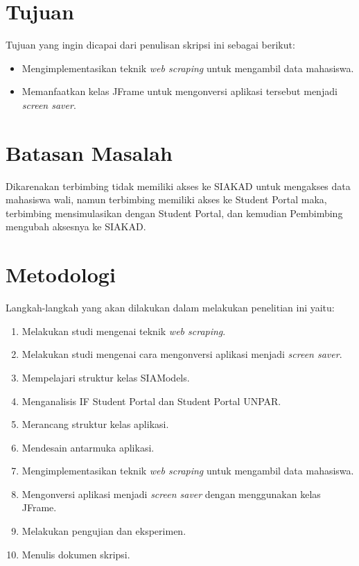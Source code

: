 \section{Tujuan}
\label{sec:tujuan}
Tujuan yang ingin dicapai dari penulisan skripsi ini sebagai berikut:
\begin{itemize}
    \item Mengimplementasikan teknik \textit{web scraping} untuk mengambil data mahasiswa.
    \item Memanfaatkan kelas JFrame untuk mengonversi aplikasi tersebut menjadi \textit{screen saver}.
\end{itemize}

\section{Batasan Masalah}
\label{sec:batasan}
Dikarenakan terbimbing tidak memiliki akses ke SIAKAD untuk mengakses data mahasiswa wali, namun terbimbing memiliki akses ke Student Portal maka, terbimbing mensimulasikan dengan Student Portal, dan kemudian Pembimbing mengubah aksesnya ke SIAKAD. 

\section{Metodologi}
\label{sec:metlit}
Langkah-langkah yang akan dilakukan dalam melakukan penelitian ini yaitu:
	\begin{enumerate}
		\item Melakukan studi mengenai teknik \textit{web scraping}.
		\item Melakukan studi mengenai cara mengonversi aplikasi menjadi \textit{screen saver}.
		\item Mempelajari struktur kelas SIAModels.
		\item Menganalisis IF Student Portal dan Student Portal UNPAR.
		\item Merancang struktur kelas aplikasi.
	    \item Mendesain antarmuka aplikasi.
	    \item Mengimplementasikan teknik \textit{web scraping} untuk mengambil data mahasiswa.
        \item Mengonversi aplikasi menjadi \textit{screen saver} dengan menggunakan kelas JFrame. 
		\item Melakukan pengujian dan eksperimen.
		\item Menulis dokumen skripsi.
	\end{enumerate}

